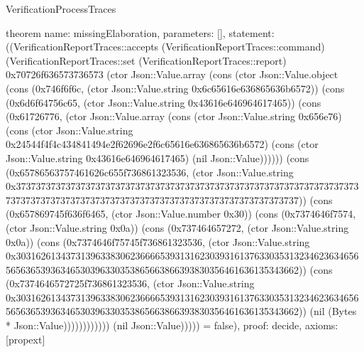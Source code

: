 \begin{lexlean}{VerificationProcessTraces}
\begin{semanticmodule}
theorem{
  name: missingElaboration,
  parameters: [],
  statement: ((VerificationReportTraces::accepts (VerificationReportTraces::command) (VerificationReportTraces::set (VerificationReportTraces::report) 0x70726f636573736573 (ctor Json::Value.array (cons (ctor Json::Value.object (cons (0x746f6f6c, (ctor Json::Value.string 0x6c65616e636865636b6572)) (cons (0x6d6f64756c65, (ctor Json::Value.string 0x43616e646964617465)) (cons (0x61726776, (ctor Json::Value.array (cons (ctor Json::Value.string 0x656e76) (cons (ctor Json::Value.string 0x24544f4f4c434841494e2f62696e2f6c65616e636865636b6572) (cons (ctor Json::Value.string 0x43616e646964617465) (nil Json::Value)))))) (cons (0x65786563757461626c655f736861323536, (ctor Json::Value.string 0x37373737373737373737373737373737373737373737373737373737373737373737373737373737373737373737373737373737373737373737373737373737)) (cons (0x657869745f636f6465, (ctor Json::Value.number 0x30)) (cons (0x7374646f7574, (ctor Json::Value.string 0x0a)) (cons (0x737464657272, (ctor Json::Value.string 0x0a)) (cons (0x7374646f75745f736861323536, (ctor Json::Value.string 0x30316261343731396338306236666539313162303931613763303531323462363465656563653936346530396330353865663866393830356461636135343662)) (cons (0x7374646572725f736861323536, (ctor Json::Value.string 0x30316261343731396338306236666539313162303931613763303531323462363465656563653936346530396330353865663866393830356461636135343662)) (nil (Bytes * Json::Value)))))))))))) (nil Json::Value))))) = false),
  proof: decide{},
  axioms: [propext]
}


\end{semanticmodule}
\end{lexlean}
